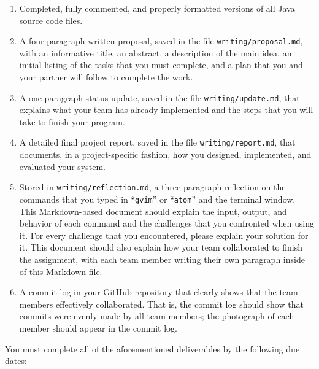 \documentclass[11pt]{article}
\newcommand{\reflection}{\lstinline{writing/reflection.md}}
\newcommand{\command}[1]{``\lstinline{#1}''}
\newcommand{\program}[1]{\lstinline{#1}}
\begin{document}
\begin{enumerate}

  \setlength{\itemsep}{0in}

  \item Completed, fully commented, and properly formatted versions of all Java
    source code files.

  \item A four-paragraph written proposal, saved in the file
    \program{writing/proposal.md}, with an informative title, an abstract, a
    description of the main idea, an initial listing of the tasks that you must
    complete, and a plan that you and your partner will follow to complete the
    work.

  \item A one-paragraph status update, saved in the file
    \program{writing/update.md}, that explains what your team has already
    implemented and the steps that you will take to finish your program.

  \item A detailed final project report, saved in the file
    \program{writing/report.md}, that documents, in a project-specific fashion,
    how you designed, implemented, and evaluated your system.

  \item Stored in \reflection{}, a three-paragraph reflection on the commands
    that you typed in \command{gvim} or \command{atom} and the terminal window.
    This Markdown-based document should explain the input, output, and behavior
    of each command and the challenges that you confronted when using it. For
    every challenge that you encountered, please explain your solution for it.
    This document should also explain how your team collaborated to finish the
    assignment, with each team member writing their own paragraph inside of this
    Markdown file.

  \item A commit log in your GitHub repository that clearly shows that the team
    members effectively collaborated. That is, the commit log should show that
    commits were evenly made by all team members; the photograph of each member
    should appear in the commit log.

\end{enumerate}

\noindent
You must complete all of the aforementioned deliverables by the following due dates:
\end{document}
